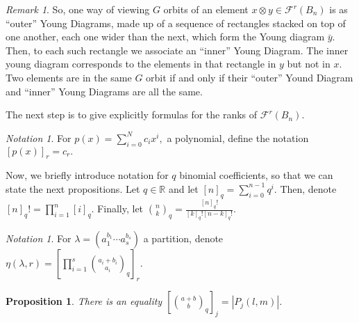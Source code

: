 \documentclass{amsart}
\newtheorem{prop}[thm]{Proposition}
\theoremstyle{remark}
\newtheorem{rem}[thm]{Remark}
\newtheorem{note}[thm]{Notation}
\newcommand\BR{{\mathbb R}}
\begin{document}
\begin{rem}
So, one way of viewing $G$ orbits of an element $x \otimes y \in \mathcal F^r(B_n)$ is as ``outer'' Young Diagrams, made up of a sequence of rectangles stacked on top of one another, each one wider than the next, which form the Young diagram $\bar y.$ Then, to each such rectangle we associate an ``inner'' Young Diagram. The inner young diagram corresponds to the elements in that rectangle in $y$ but not in $x.$ Two elements are in the same $G$ orbit if and only if their ``outer'' Yound Diagram and ``inner'' Young Diagrams are all the same.
\end{rem}

The next step is to give explicitly formulas for the ranks of $\mathcal F^r(B_n).$

\begin{note}
For $p(x) = \sum_{i=0}^N c_ix^i,$ a polynomial, define the notation $[p(x)]_r = c_r.$
\end{note}

Now, we briefly introduce notation for $q$ binomial coefficients, so that we can state the next propositions. Let $q \in \BR$ and let $[n]_q = \sum_{i=0}^{n-1} q^i.$ Then, denote $[n]_q! = \prod_{i=1}^n [i]_q.$ Finally, let $\binom n k_q = \frac{[n]_q!}{[k]_q![n-k]_q!}.$

\begin{note}
For $\lambda = (a_1^{b_1} \cdots a_s^{b_s})$ a partition, denote $\eta(\lambda,r) = \left[\prod_{i=1}^s \binom{a_i+b_i}{a_i}_q\right]_r.$
\end{note}

\begin{prop}
\cite[Proposition 1.3.19]{enumerative_comb}
\label{prop:counting_box_partitions}
There is an equality $[\binom {a+b} b_q]_j = |P_j(l,m)|.$
\end{prop}
\end{document}
